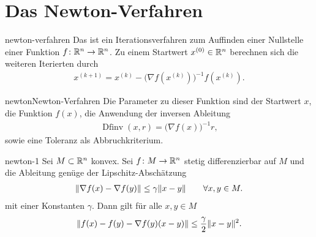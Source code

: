 \section{Das Newton-Verfahren}

\begin{Definition}{newton-verfahren}
  Das  ist ein Iterationsverfahren zum
  Auffinden einer Nullstelle einer Funktion $f\colon \mathbb R^n\to \mathbb R^n$. Zu
  einem Startwert $x^{(0)} \in \mathbb R^n$ berechnen sich die weiteren
  Iterierten durch
  \begin{gather}
    \label{eq:newton:1}
    x^{(k+1)} = x^{(k)} - \bigl(\nabla f(x^{(k)})\bigr)^{-1} f(x^{(k)}).
  \end{gather}
\end{Definition}

\begin{Algorithmus*}{newton}{Newton-Verfahren}
   Die
  Parameter zu dieser Funktion sind der Startwert $x$, die Funktion
  $f(x)$, die Anwendung der inversen Ableitung
  \begin{gather}
    \operatorname{Dfinv}(x,r) = \bigl(\nabla f(x)\bigr)^{-1}r,
  \end{gather}
  sowie eine Toleranz als Abbruchkriterium.
\end{Algorithmus*}
\begin{Lemma}{newton-1}
  Sei $M\subset \mathbb R^n$ konvex. Sei $f\colon M\to \mathbb R^n$ stetig differenzierbar auf $M$ und die Ableitung genüge der Lipschitz-Abschätzung
  \begin{gather}
    \lVert\nabla f(x) - \nabla f(y)\rVert \le \gamma \lVert x-y\rVert
    \qquad \forall x,y\in M.
  \end{gather}
  mit einer Konstanten $\gamma$. Dann gilt für alle $x,y\in M$
  \begin{gather}
    \lVert f(x)-f(y) - \nabla f(y)(x-y)\rVert
    \le \frac\gamma2 \lVert x-y\rVert^2.
  \end{gather}
\end{Lemma}

